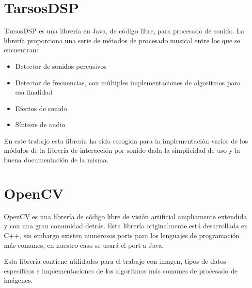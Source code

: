  
 \section{TarsosDSP}
  \label{subsec:tarsos-dsp}
 TarsosDSP\cite{six2014tarsosdsp} es una librería en Java, de código libre, para procesado de sonido.
 La librería proporciona una serie de métodos de procesado musical entre los que se encuentran:
 \begin{itemize}
 	\item Detector de sonidos percusivos
 	\item Detector de frecuencias, con múltiples implementaciones de algoritmos para esa finalidad
 	\item Efectos de sonido
 	\item Síntesis de audio
 \end{itemize}
 
 En este trabajo esta librería ha sido escogida para la implementación varios de los módulos de la librería de interacción por sonido dada la simplicidad de uso  y la buena documentación de la misma.
 
 \section{OpenCV}
  \label{subsec:opencv}
 OpenCV\cite{itseez2015opencv} es una librería de código libre de visión artificial ampliamente extendida y con una gran comunidad detrás.
 Esta librería originalmente está desarrollada en C++, sin embargo existen numerosos ports para los lenguajes de programación más comunes, en nuestro caso se usará el port a Java.
 
 Esta librería contiene utilidades para el trabajo con imagen, tipos de datos específicos e implementaciones de los algoritmos más comunes de procesado de imágenes.
 
